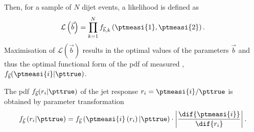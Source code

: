 Then, for a sample of $N$ dijet events, a likelihood is defined as
\begin{equation}
  \label{eq:resFit:likelihood}
  \mathcal{L}\left(\vec{b}\right) = \prod^{N}_{k=1} f_{\vec{b},k}\left(\ptmeasi{1},\ptmeasi{2}\right).
\end{equation}
Maximisation of $\mathcal{L}(\vec{b})$ results in the optimal values of the parameters $\vec{b}$ and thus the optimal functional form of the pdf of measured \pt, $f_{\vec{b}}(\ptmeasi{i}|\pttrue)$.

The pdf $f_{\vec{b}}(r_{i}|\pttrue)$ of the jet \pt response \mbox{$r_{i} = \ptmeasi{i} / \pttrue$} is obtained by parameter transformation
\begin{equation*}
  f_{\vec{b}}\left(r_{i}|\pttrue\right) =
  f_{\vec{b}}\left(\ptmeasi{i}\left(r_{i}\right)|\pttrue\right)\cdot\left|\frac{\dif{\ptmeasi{i}}}{\dif{r_{i}}}\right|.
\end{equation*}
